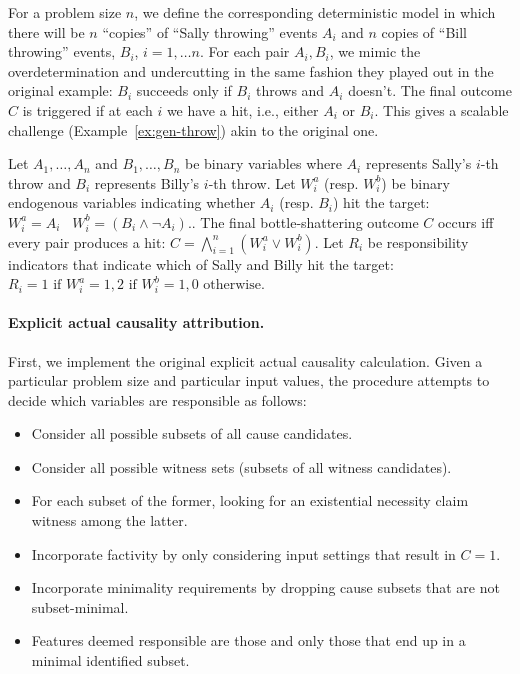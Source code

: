 \documentclass[anon,12pt]{clear2026} %
\begin{document}
For a problem size $n$, we define the corresponding deterministic model in which there will be $n$ ``copies'' of ``Sally throwing'' events $A_i$ and $n$ copies of ``Bill throwing'' events, $B_i$, $i = 1, \dots n$. 
For each pair $A_i, B_i$, we mimic the overdetermination and undercutting in the same fashion they played out in the original example: $B_i$ succeeds only if $B_i$ throws and $A_i$ doesn't. 
The final outcome $C$ is triggered if at each $i$ we have a hit, i.e., either $A_i$ or $B_i$. 
This gives a scalable challenge (Example~\ref{ex:gen-throw}) akin to the original one.

\begin{example}\label{ex:gen-throw} 
Let $A_1,\dots,A_n$ and $B_1,\dots,B_n$ be binary variables where $A_i$ represents Sally’s $i$-th throw and $B_i$ represents Billy’s $i$-th throw.
Let $W^a_i$ (resp. $W^b_i$) be binary endogenous variables indicating whether $A_i$ (resp. $B_i$) hit the target:
$
W^a_i = A_i \,\,\,\,\, W^b_i = (B_i \land \lnot A_i).
$.
The final bottle-shattering outcome $C$ occurs iff every pair produces a hit:
$C = \bigwedge_{i=1}^n \left( W^a_i \vee W^b_i\right).
$
Let $R_i$ be responsibility indicators that indicate which of Sally and Billy hit the target:
$R_i = 1  \text{ if } W^a_i = 1, 2  \text{ if } W^b_i = 1, 0 \text{ otherwise}.
$
\end{example}


\paragraph{Explicit actual causality attribution.} First, we implement the original explicit actual causality calculation. Given a particular problem size and  particular input values, the procedure attempts to decide which variables are responsible as follows:

\begin{itemize}[noitemsep, topsep=1pt, leftmargin=*]
\item  Consider all possible subsets of all cause candidates.
\item   Consider all possible witness sets (subsets of all witness candidates).
\item   For each subset of the former, looking for an existential necessity claim witness among the latter.
\item  Incorporate factivity by only considering input settings that result in $C=1$.
\item Incorporate minimality requirements by dropping cause subsets that are not subset-minimal.
\item Features deemed responsible are those and only those that end up in a minimal identified subset.
\end{itemize}
\end{document}

